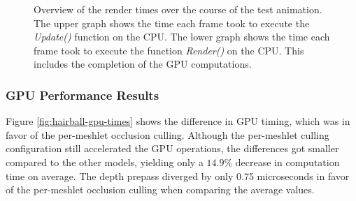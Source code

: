 \begin{figure}[!htb]
\begin{center}
    \caption{Overview of the render times over the course of the test animation. The upper graph shows the time 
    each frame took to execute the \emph{Update()} function on the \ac{CPU}. The lower graph shows the time each 
    frame took to execute the function \emph{Render()} on the \ac{CPU}. This includes the completion of the 
    \ac{GPU} computations.}
    \label{plt:hairball-256-culling-cpu-time}
  \end{center}
\end{figure}

\subsubsection*{GPU Performance Results} \label{subsubsec-gpu-performance-results-hairball}

Figure \ref{fig:hairball-gpu-times} shows the difference in \ac{GPU} timing, which was in favor of the 
per-meshlet occlusion culling. Although the per-meshlet culling configuration still accelerated the \ac{GPU} 
operations, the differences got smaller compared to the other models, yielding only a $14.9\%$ decrease in 
computation time on average. The depth prepass diverged by only 0.75 microseconds in favor of the per-meshlet 
occlusion culling when comparing the average values.  

